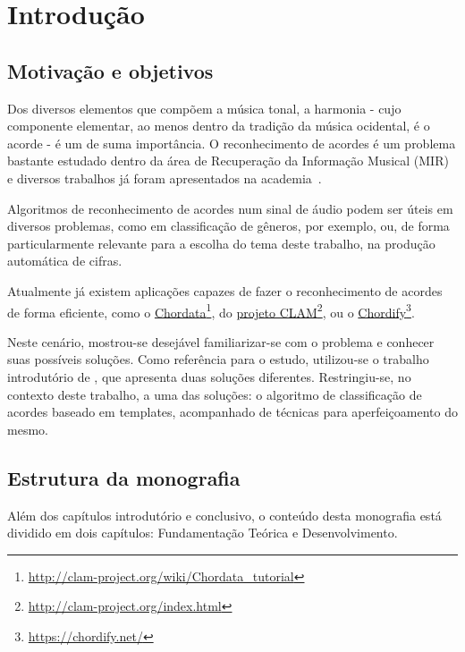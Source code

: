 \chapter{Introdução}
\label{cap:introducao}

\section{Motivação e objetivos}
    Dos diversos elementos que compõem a música tonal, a harmonia - cujo componente elementar, ao menos dentro da tradição da música ocidental, é o acorde - é um de suma importância. O reconhecimento de acordes é um problema bastante estudado dentro da área de Recuperação da Informação Musical (MIR) e diversos trabalhos já foram apresentados na academia~\cite{harte,muller}.
    
    Algoritmos de reconhecimento de acordes num sinal de áudio podem ser úteis em diversos problemas, como em classificação de gêneros, por exemplo, ou, de forma particularmente relevante para a escolha do tema deste trabalho, na produção automática de cifras.
    
    Atualmente já existem aplicações capazes de fazer o reconhecimento de acordes de forma eficiente, como o \href{http://clam-project.org/wiki/Chordata_tutorial}{Chordata}\footnote{\url{http://clam-project.org/wiki/Chordata_tutorial}}, do \href{http://clam-project.org/index.html}{projeto CLAM}\footnote{\url{http://clam-project.org/index.html}}, ou o \href{https://chordify.net/}{Chordify}\footnote{\url{https://chordify.net/}}.
    
    
    Neste cenário, mostrou-se desejável familiarizar-se com o problema e conhecer suas possíveis soluções. Como referência para o estudo, utilizou-se o trabalho introdutório de \cite{muller}, que apresenta duas soluções diferentes. Restringiu-se, no contexto deste trabalho, a uma das soluções: o algoritmo de classificação de acordes baseado em templates, acompanhado de técnicas para aperfeiçoamento do mesmo.

\section{Estrutura da monografia}
    Além dos capítulos introdutório e conclusivo, o conteúdo desta monografia está dividido em dois capítulos: Fundamentação Teórica e Desenvolvimento.
    

